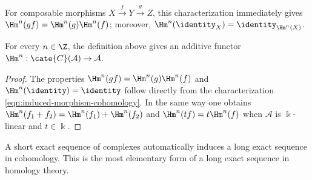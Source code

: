 For composable morphisms $X\xrightarrow{f}Y\xrightarrow{g}Z$, this
characterization immediately gives
$\Hm^n(gf)=\Hm^n(g)\Hm^n(f)$; moreover,
$\Hm^n(\identity_X)=\identity_{\Hm^n(X)}$.

\begin{proposition}\label{prop:H-functor}
	For every $n\in\Z$, the definition above gives an additive functor
	$\Hm^n:\cate{C}(\mathcal{A})\to\mathcal{A}$.
\end{proposition}

\begin{proof}
	The properties $\Hm^n(gf)=\Hm^n(g)\Hm^n(f)$ and
	$\Hm^n(\identity)=\identity$ follow directly from the characterization
	\eqref{eqn:induced-morphism-cohomology}. In the same way one obtains
	$\Hm^n(f_1+f_2)=\Hm^n(f_1)+\Hm^n(f_2)$ and
	$\Hm^n(tf)=t\Hm^n(f)$ when $\mathcal{A}$ is $\Bbbk$-linear and
	$t\in\Bbbk$.
\end{proof}

A short exact sequence of complexes automatically induces a long exact
sequence in cohomology. This is the most elementary form of a long exact
sequence in homology theory.

